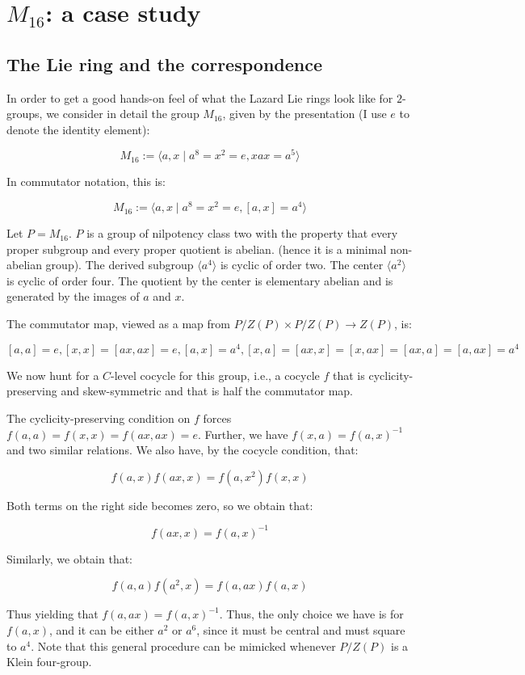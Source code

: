 \documentclass[10pt]{amsart}
\begin{document}
\section{$M_{16}$: a case study}

\subsection{The Lie ring and the correspondence}

In order to get a good hands-on feel of what the Lazard Lie rings look
like for $2$-groups, we consider in detail the group $M_{16}$, given
by the presentation (I use $e$ to denote the identity element):

$$M_{16} := \langle a, x \mid a^8 = x^2 = e, xax = a^5 \rangle$$

In commutator notation, this is:

$$M_{16} := \langle a,x \mid a^8 = x^2 = e, [a,x] = a^4 \rangle$$

Let $P = M_{16}$. $P$ is a group of nilpotency class two with the
property that every proper subgroup and every proper quotient is
abelian. (hence it is a minimal non-abelian group). The derived
subgroup $\langle a^4 \rangle$ is cyclic of order two. The center
$\langle a^2 \rangle$ is cyclic of order four. The quotient by the
center is elementary abelian and is generated by the images of $a$ and
$x$.

The commutator map, viewed as a map from $P/Z(P) \times P/Z(P) \to
Z(P)$, is:

$$[a,a] = e, [x,x] = [ax,ax] = e, [a,x] = a^4, [x,a] = [ax,x] = [x,ax] = [ax,a] = [a,ax] = a^4$$

We now hunt for a $C$-level cocycle for this group, i.e., a cocycle
$f$ that is cyclicity-preserving and skew-symmetric and that is half
the commutator map.

The cyclicity-preserving condition on $f$ forces $f(a,a) = f(x,x) =
f(ax,ax) = e$. Further, we have $f(x,a) = f(a,x)^{-1}$ and two similar
relations. We also have, by the cocycle condition, that:

$$f(a,x)f(ax,x) = f(a,x^2)f(x,x)$$

Both terms on the right side becomes zero, so we obtain that:

$$f(ax,x) = f(a,x)^{-1}$$

Similarly, we obtain that:

$$f(a,a)f(a^2,x) = f(a,ax)f(a,x)$$

Thus yielding that $f(a,ax) = f(a,x)^{-1}$. Thus, the only choice we
have is for $f(a,x)$, and it can be either $a^2$ or $a^6$, since it
must be central and must square to $a^4$. Note that this general
procedure can be mimicked whenever $P/Z(P)$ is a Klein four-group.
\end{document}
